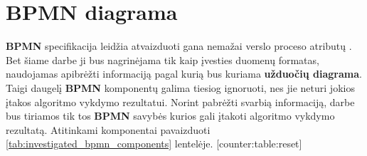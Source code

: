 \documentclass{VUMIFInfBakalaurinis}
\begin{document}
\section{BPMN diagrama}
\textbf{BPMN} specifikacija leidžia atvaizduoti gana nemažai verslo proceso atributų \cite{bpmnFormal}. Bet šiame darbe ji bus nagrinėjama tik kaip įvesties duomenų formatas, naudojamas apibrėžti informaciją pagal kurią bus kuriama \textbf{užduočių diagrama}. Taigi daugelį \textbf{BPMN} komponentų galima tiesiog ignoruoti, nes jie neturi jokios įtakos algoritmo vykdymo rezultatui. Norint pabrėžti svarbią informaciją, darbe bus tiriamos tik tos \textbf{BPMN} savybės kurios gali įtakoti algoritmo vykdymo rezultatą. Atitinkami komponentai pavaizduoti \ref{tab:investigated_bpmn_components} lentelėje.
[counter:table:reset]
\newcommand\rownumber{\stepcounter{counter:table}\arabic{counter:table}}
\end{document}
